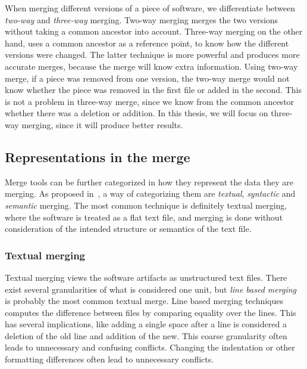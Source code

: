 \documentclass[a4paper,english]{ifimaster}
\begin{document}
When merging different versions of a piece of software, we differentiate between \textit{two-way} and \textit{three-way} merging. Two-way merging merges the two versions without taking a common ancestor into account. Three-way merging on the other hand, uses a common ancestor as a reference point, to know how the different versions were changed. The latter technique is more powerful and produces more accurate merges, because the merge will know extra information. Using two-way merge, if a piece was removed from one version, the two-way merge would not know whether the piece was removed in the first file or added in the second. This is not a problem in three-way merge, since we know from the common ancestor whether there was a deletion or addition. In this thesis, we will focus on three-way merging, since it will produce better results.

\subsection{Representations in the merge}%
\label{sub:representations_in_the_merge}

Merge tools can be further categorized in how they represent the data they are merging. As proposed in~\cite{cite:tom_mens_software_merging_survey}, a way of categorizing them are \textit{textual}, \textit{syntactic} and \textit{semantic} merging. The most common technique is definitely textual merging, where the software is treated as a flat text file, and merging is done without consideration of the intended structure or semantics of the text file.

\subsubsection{Textual merging}%
\label{ssub:textual_merging}

Textual merging views the software artifacts as unstructured text files. There exist several granularities of what is considered one unit, but \textit{line based merging} is probably the most common textual merge. Line based merging techniques computes the difference between files by comparing equality over the lines. This has several implications, like adding a single space after a line is considered a deletion of the old line and addition of the new. This coarse granularity often leads to unnecessary and confusing conflicts. Changing the indentation or other formatting differences often lead to unnecessary conflicts.
\end{document}
